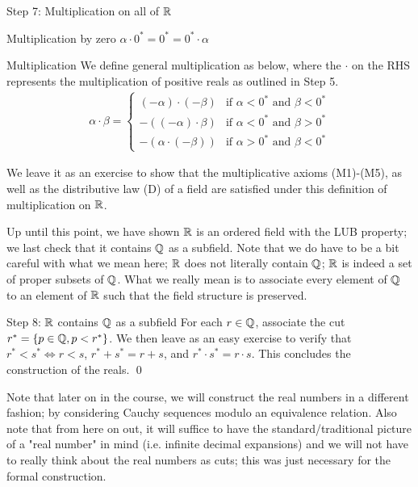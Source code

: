 \begin{nblank}{Step 7: Multiplication on all of $\mathbb{R}$}
    \begin{ndef}{Multiplication by zero}
        $\alpha \cdot 0^* = 0^* = 0^* \cdot \alpha$
    \end{ndef}
    \begin{ndef}{Multiplication}
        We define general multiplication as below, where the $\cdot$ on the RHS represents the multiplication of positive reals as outlined in Step 5. 
        \begin{align*}
            \alpha \cdot \beta = 
            \begin{cases}
            (-\alpha)\cdot(-\beta) & \text{if $\alpha < 0^*$ and $\beta < 0^*$}
            \\ -\left((-\alpha)\cdot\beta\right) & \text{if $\alpha < 0^*$ and $\beta > 0^*$}
            \\ -\left(\alpha \cdot (-\beta)\right) & \text{if $\alpha > 0^*$ and $\beta < 0^*$}
            \end{cases}
        \end{align*}
    \end{ndef}
    We leave it as an exercise to show that the multiplicative axioms (M1)-(M5), as well as the distributive law (D) of a field are satisfied under this definition of multiplication on $\mathbb{R}$. 
\end{nblank}
\noindent Up until this point, we have shown $\mathbb{R}$ is an ordered field with the LUB property; we last check that it contains $\mathbb{Q}$ as a subfield. Note that we do have to be a bit careful with what we mean here; $\mathbb{R}$ does not literally contain $\mathbb{Q}$; $\mathbb{R}$ is indeed a set of proper subsets of $\mathbb{Q}$. What we really mean is to associate every element of $\mathbb{Q}$ to an element of $\mathbb{R}$ such that the field structure is preserved. 
\begin{nblank}{Step 8: $\mathbb{R}$ contains $\mathbb{Q}$ as a subfield}
    For each $r \in \mathbb{Q}$, associate the cut $r^* = \set{p \in \mathbb{Q}, p < r^*}$. We then leave as an easy exercise to verify that $r^* < s^* \iff r < s$, $r^* + s^* = r + s$, and $r^*\cdot s^* = r\cdot s$. This concludes the construction of the reals. \qed
\end{nblank}
\noindent Note that later on in the course, we will construct the real numbers in a different fashion; by considering Cauchy sequences modulo an equivalence relation. Also note that from here on out, it will suffice to have the standard/traditional picture of a "real number" in mind (i.e. infinite decimal expansions) and we will not have to really think about the real numbers as cuts; this was just necessary for the formal construction.

